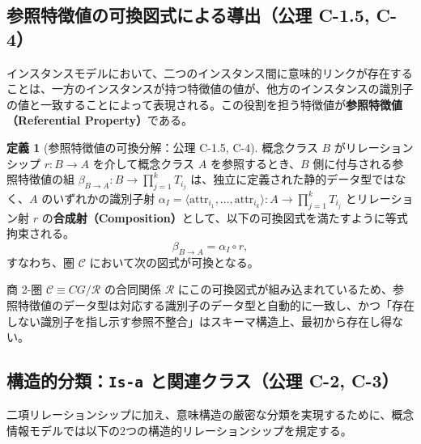 \documentclass[11pt,a4paper]{ltjsarticle}
\theoremstyle{definition}
\newtheorem{definition}{定義}[section]
\theoremstyle{plain}
\theoremstyle{remark}
\begin{document}
\subsection{参照特徴値の可換図式による導出（公理 C-1.5, C-4）}
インスタンスモデルにおいて、二つのインスタンス間に意味的リンクが存在することは、一方のインスタンスが持つ特徴値の値が、他方のインスタンスの識別子の値と一致することによって表現される。この役割を担う特徴値が\textbf{参照特徴値（Referential Property）}である。

\begin{definition}[参照特徴値の可換分解：公理 C-1.5, C-4]\label{def:ref-prop}
概念クラス $B$ がリレーションシップ $r : B \to A$ を介して概念クラス $A$ を参照するとき、$B$ 側に付与される参照特徴値の組 $\beta_{B \to A} : B \to \prod_{j=1}^k T_{i_j}$ は、独立に定義された静的データ型ではなく、$A$ のいずれかの識別子射 $\alpha_I = \langle \mathrm{attr}_{i_1}, \dots, \mathrm{attr}_{i_k} \rangle : A \to \prod_{j=1}^k T_{i_j}$ とリレーション射 $r$ の\textbf{合成射（Composition）}として、以下の可換図式を満たすように等式拘束される。
\begin{equation}
\beta_{B \to A} = \alpha_I \circ r,
\end{equation}
すなわち、圏 $\mathcal{C}$ において次の図式が可換となる。
\begin{center}
\end{center}
\end{definition}

商 2-圏 $\mathcal{C} \equiv CG/\mathcal{R}$ の合同関係 $\mathcal{R}$ にこの可換図式が組み込まれているため、参照特徴値のデータ型は対応する識別子のデータ型と自動的に一致し、かつ「存在しない識別子を指し示す参照不整合」はスキーマ構造上、最初から存在し得ない。

\subsection{構造的分類：\texttt{Is-a} と関連クラス（公理 C-2, C-3）}
二項リレーションシップに加え、意味構造の厳密な分類を実現するために、概念情報モデルでは以下の2つの構造的リレーションシップを規定する。
\end{document}
